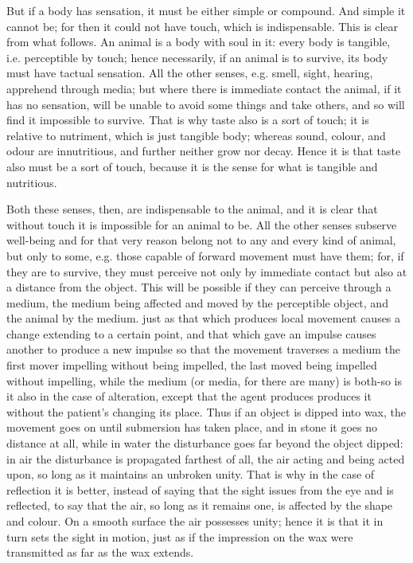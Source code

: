 But if a body has sensation, it must be either simple or compound.
And simple it cannot be; for then it could not have touch, which is
indispensable. This is clear from what follows. An animal is a body
with soul in it: every body is tangible, i.e. perceptible by touch;
hence necessarily, if an animal is to survive, its body must have
tactual sensation. All the other senses, e.g. smell, sight, hearing,
apprehend through media; but where there is immediate contact the
animal, if it has no sensation, will be unable to avoid some things
and take others, and so will find it impossible to survive. That is
why taste also is a sort of touch; it is relative to nutriment, which
is just tangible body; whereas sound, colour, and odour are innutritious,
and further neither grow nor decay. Hence it is that taste also must
be a sort of touch, because it is the sense for what is tangible and
nutritious. 

Both these senses, then, are indispensable to the animal, and it is
clear that without touch it is impossible for an animal to be. All
the other senses subserve well-being and for that very reason belong
not to any and every kind of animal, but only to some, e.g. those
capable of forward movement must have them; for, if they are to survive,
they must perceive not only by immediate contact but also at a distance
from the object. This will be possible if they can perceive through
a medium, the medium being affected and moved by the perceptible object,
and the animal by the medium. just as that which produces local movement
causes a change extending to a certain point, and that which gave
an impulse causes another to produce a new impulse so that the movement
traverses a medium the first mover impelling without being impelled,
the last moved being impelled without impelling, while the medium
(or media, for there are many) is both-so is it also in the case of
alteration, except that the agent produces produces it without the
patient's changing its place. Thus if an object is dipped into wax,
the movement goes on until submersion has taken place, and in stone
it goes no distance at all, while in water the disturbance goes far
beyond the object dipped: in air the disturbance is propagated farthest
of all, the air acting and being acted upon, so long as it maintains
an unbroken unity. That is why in the case of reflection it is better,
instead of saying that the sight issues from the eye and is reflected,
to say that the air, so long as it remains one, is affected by the
shape and colour. On a smooth surface the air possesses unity; hence
it is that it in turn sets the sight in motion, just as if the impression
on the wax were transmitted as far as the wax extends. 

